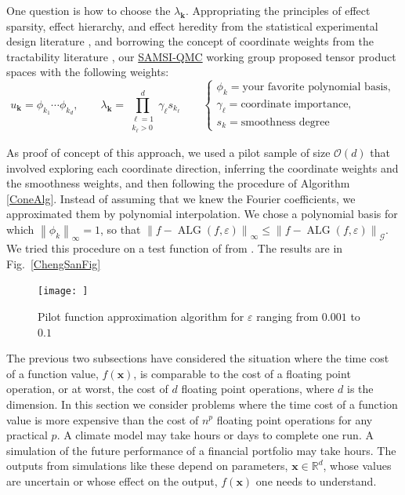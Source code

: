 \documentclass[11pt]{NSFamsart}
\newcommand{\SAMSIQMC}{\hyperlink{SAMSIlink}{SAMSI-QMC}\xspace}
\newcommand{\reals}{{\mathbb{R}}}
\DeclareMathOperator{\ALG}{ALG}
\newcommand{\bx}{{\boldsymbol{x}}}
\newcommand{\bk}{{\boldsymbol{k}}}
\newcommand{\calg}{{\mathcal{G}}}
\newcommand{\norm}[2][{}]{\ensuremath{\left \lVert #2 \right \rVert}_{#1}}
\newcommand{\Order}{\mathcal{O}}
\begin{document}
One question is how to choose the $\lambda_{\bk}$.  Appropriating the principles of effect sparsity, effect hierarchy, and effect heredity from the statistical experimental design literature \cite{WuHam00}, and borrowing the concept of coordinate weights from the tractability literature \cite{DicEtal14a}, our \SAMSIQMC working group proposed tensor product spaces with the following weights:
\[
u_{\bk} = \phi_{k_1} \cdots \phi_{k_d}, \qquad \lambda_{\bk} = \prod_{\substack{\ell = 1 \\ k_{\ell} > 0 }}^d \gamma_{\ell}s_{k_\ell} 
\qquad \begin{cases} \phi_k = \text{your favorite polynomial basis}, \\
\gamma_{\ell} = \text{coordinate importance}, \\
s_{k} = \text{smoothness degree}
\end{cases}
\]

As proof of concept of this approach, we used a pilot sample of size $\Order(d)$ that involved exploring each coordinate direction, inferring the coordinate weights and the smoothness weights, and then following the procedure of Algorithm \ref{ConeAlg}.  Instead of assuming that we knew the Fourier coefficients, we approximated them by polynomial interpolation.  We chose a polynomial basis for which $\norm[\infty]{\phi_k} = 1$, so that $\norm[\infty]{f - \ALG(f,\varepsilon)} \le \norm[\calg]{f - \ALG(f,\varepsilon)}$.  We tried this procedure on a test function of \cite{ChenSan10a} from \cite{VirLib17a}.  The results are in Fig.\ \ref{ChengSanFig}

\begin{figure}
    \centering
    \texttt{[image: ]}
    \caption{Pilot function approximation algorithm for $\varepsilon$ ranging from $0.001$ to $0.1$}
    \label{fig:my_label}
\end{figure}

The previous two subsections have considered the situation where the time cost of a function value, 
$f(\bx)$, is comparable to the cost of a floating point operation, or at worst, the cost of $d$ floating 
point 
operations, where $d$ is the dimension.  In this section we consider problems where the time cost 
of a function value is more expensive than the cost of $n^p$ floating point operations for any 
practical $p$.  A climate model may take hours or days to complete one run.  A simulation of the 
future performance of a financial portfolio may take hours.  The outputs from simulations like these 
depend on parameters, $\bx \in \reals^d$, whose values are uncertain or whose effect 
on the output, $f(\bx)$ one needs to understand.
\end{document}
